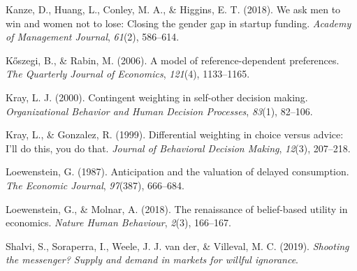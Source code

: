 \documentclass[
  man,floatsintext]{apa6}
\newlength{\cslhangindent}
\newlength{\cslentryspacingunit} %
\newenvironment{CSLReferences}[2] %
 {%
  \setlength{\parindent}{0pt}
  \ifodd #1
  \let\oldpar\par
  \def\par{\hangindent=\cslhangindent\oldpar}
  \fi
  \setlength{\parskip}{#2\cslentryspacingunit}
 }%
 {}
\begin{document}
\begin{CSLReferences}{1}{0}
\leavevmode{}%
Kanze, D., Huang, L., Conley, M. A., \& Higgins, E. T. (2018). We ask men to win and women not to lose: {Closing} the gender gap in startup funding. \emph{Academy of Management Journal}, \emph{61}(2), 586--614.

\leavevmode{}%
Kőszegi, B., \& Rabin, M. (2006). A model of reference-dependent preferences. \emph{The Quarterly Journal of Economics}, \emph{121}(4), 1133--1165.

\leavevmode{}%
Kray, L. J. (2000). Contingent weighting in self-other decision making. \emph{Organizational Behavior and Human Decision Processes}, \emph{83}(1), 82--106.

\leavevmode{}%
Kray, L., \& Gonzalez, R. (1999). Differential weighting in choice versus advice: {I}'ll do this, you do that. \emph{Journal of Behavioral Decision Making}, \emph{12}(3), 207--218.

\leavevmode{}%
Loewenstein, G. (1987). Anticipation and the valuation of delayed consumption. \emph{The Economic Journal}, \emph{97}(387), 666--684.

\leavevmode{}%
Loewenstein, G., \& Molnar, A. (2018). The renaissance of belief-based utility in economics. \emph{Nature Human Behaviour}, \emph{2}(3), 166--167.

\leavevmode{}%
Shalvi, S., Soraperra, I., Weele, J. J. van der, \& Villeval, M. C. (2019). \emph{Shooting the messenger? Supply and demand in markets for willful ignorance}.

\end{CSLReferences}

\endgroup
\end{document}
